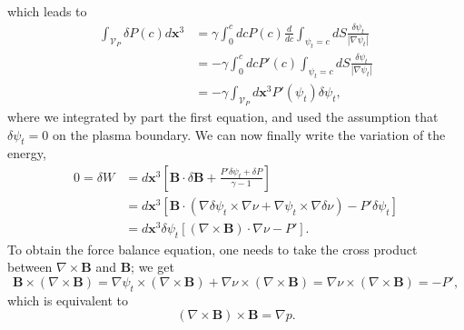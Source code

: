 \documentclass[my_thesis.tex]{subfiles}
\begin{document}
which leads to
\begin{align}
	\int_{\mathcal{V}_P}\delta P(c)d\mathbf{x}^3 &= \gamma\int_0^c dc P(c) \frac{d}{dc}\int_{\psi_t=c}dS\frac{\delta\psi_t}{|\nabla\psi_t|}\\
	&= -\gamma\int_0^c dc P'(c) \int_{\psi_t=c}dS\frac{\delta\psi_t}{|\nabla\psi_t|}\\
	&= -\gamma\int_{\mathcal{V}_P} d\mathbf{x}^3 P'(\psi_t)\delta\psi_t,
\end{align}
where we integrated by part the first equation, and used the assumption that $\delta\psi_t=0$ on the plasma boundary. We can now finally write the variation of the energy,
\begin{align}
	0 = \delta W &= d\mathbf{x}^3 \left[\mathbf{B}\cdot\delta\mathbf{B} + \frac{P'\delta\psi_t + \delta P}{\gamma-1}\right]\\
	&= d\mathbf{x}^3 \left[\mathbf{B}\cdot (\nabla\delta\psi_t\times\nabla\nu + \nabla\psi_t\times\nabla\delta\nu) -P'\delta\psi_t\right]\\
	&= d\mathbf{x}^3 \delta\psi_t\left[(\nabla\times\mathbf{B})\cdot\nabla\nu -P'\right].
\end{align}
To obtain the force balance equation, one needs to take the cross product between $\nabla\times\mathbf{B}$ and $\mathbf{B}$; we get
\begin{equation}
	\mathbf{B}\times(\nabla\times\mathbf{B}) = \nabla\psi_t\times(\nabla\times\mathbf{B}) + \nabla\nu\times(\nabla\times\mathbf{B}) = \nabla\nu\times(\nabla\times\mathbf{B}) = -P',
\end{equation}
which is equivalent to
\begin{equation}
	(\nabla\times\mathbf{B})\times\mathbf{B} = \nabla p.
\end{equation}
\end{document}
